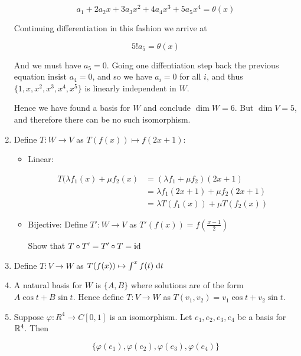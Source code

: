 \documentclass[a4paper]{article}
\begin{document}
\begin{enumerate}[label = (\alph*)]
		\[ a_{1} + 2a_{2} x + 3 a_{3} x^{2} + 4 a_{4} x^{3} + 5 a_{5} x^{4} = \theta(x) \]
		
		Continuing differentiation in this fashion we arrive at
		
		\[ 5! a_{5} = \theta(x) \]
		
		And we must have $ a_{5} = 0 $. Going one diffentiation step back the previous equation insist $ a_{4} = 0 $, and so we have $ a_{i} = 0 $ for all $ i $, and thus  $ \{1,x,x^{2},x^{3},x^{4},x^{5}\} $ is linearly independent in $ W $. 
		
		Hence we have found a basis for $ W $ and conclude $ \dim W = 6 $. But $ \dim V = 5$, and therefore there can be no such isomorphism.
		
		
		\item Define $ T : W \to V $ as $ T(f(x)) \mapsto f(2x + 1) $:
		
		\begin{itemize}
			\item Linear: 
			
			\begin{align*}
			T(\lambda f_{1}(x) + \mu f_{2}(x)& = (\lambda f_{1} + \mu f_{2})(2x + 1) \\
			& = \lambda f_{1} (2x + 1) + \mu f_{2} (2x + 1)\\
			& = \lambda T(f_{1}(x)) + \mu T(f_{2}(x))
			\end{align*}
			
			\item Bijective: Define $ T':W \to V $ as $ T'(f(x)) = f(\frac{x-1}{2}) $ 
			
			Show that $ T \circ T' = T' \circ T = \operatorname{id} $
			
		\end{itemize}
		
		\item Define $ T : V \to W $ as $ T(f(x)) \mapsto \int^{x} f(t) \; \mathrm{d} t $
		
		\item A natural basis for $ W $ is $ \{ A,B \} $ where solutions are of the form $ A \cos t + B \sin t $. Hence define $ T : V \to W $ as $ T(v_{1},v_{2}) = v_{1} \cos t + v_{2} \sin t $.
		
		\item Suppose $ \varphi : R^{4} \to C[0,1] $ is an isomorphism. Let $ e_{1},e_{2},e_{3},e_{4} $ be a basis for $ \mathbb{R}^{4} $. Then 
		
		\[ \{ \varphi(e_{1}),\varphi(e_{2}),\varphi(e_{3}),\varphi(e_{4}) \} \]
		

\end{enumerate}
\end{document}
